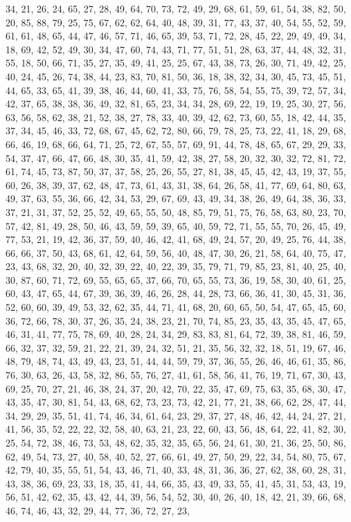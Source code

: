 \documentclass[
]{article}
\begin{document}
\begin{Schunk}
\begin{Soutput}
34, 21, 26, 24, 65, 27, 28, 49, 64, 70, 73, 72, 49, 29, 68, 61, 59, 61, 54, 38, 82, 50, 20, 85, 88, 79, 25, 75, 67, 62, 62, 64, 40, 48, 39, 31, 77, 43, 37, 40, 54, 55, 52, 59, 61, 61, 48, 65, 44, 47, 46, 57, 71, 46, 65, 39, 53, 71, 72, 28, 45, 22, 29, 49, 49, 34, 18, 69, 42, 52, 49, 30, 34, 47, 60, 74, 43, 71, 77, 51, 51, 28, 63, 37, 44, 48, 32, 31, 55, 18, 50, 66, 71, 35, 27, 35, 49, 41, 25, 25, 67, 43, 38, 73, 26, 30, 71, 49, 42, 25, 40, 24, 45, 26, 74, 38, 44, 23, 83, 70, 81, 50, 36, 18, 38, 32, 34, 30, 45, 73, 45, 51, 44, 65, 33, 65, 41, 39, 38, 46, 44, 60, 41, 33, 75, 76, 58, 54, 55, 75, 39, 72, 57, 34, 42, 37, 65, 38, 38, 36, 49, 32, 81, 65, 23, 34, 34, 28, 69, 22, 19, 19, 25, 30, 27, 56, 63, 56, 58, 62, 38, 21, 52, 38, 27, 78, 33, 40, 39, 42, 62, 73, 60, 55, 18, 42, 44, 35, 37, 34, 45, 46, 33, 72, 68, 67, 45, 62, 72, 80, 66, 79, 78, 25, 73, 22, 41, 18, 29, 68, 66, 46, 19, 68, 66, 64, 71, 25, 72, 67, 55, 57, 69, 91, 44, 78, 48, 65, 67, 29, 29, 33, 54, 37, 47, 66, 47, 66, 48, 30, 35, 41, 59, 42, 38, 27, 58, 20, 32, 30, 32, 72, 81, 72, 61, 74, 45, 73, 87, 50, 37, 37, 58, 25, 26, 55, 27, 81, 38, 45, 45, 42, 43, 19, 37, 55, 60, 26, 38, 39, 37, 62, 48, 47, 73, 61, 43, 31, 38, 64, 26, 58, 41, 77, 69, 64, 80, 63, 49, 37, 63, 55, 36, 66, 42, 34, 53, 29, 67, 69, 43, 49, 34, 38, 26, 49, 64, 38, 36, 33, 37, 21, 31, 37, 52, 25, 52, 49, 65, 55, 50, 48, 85, 79, 51, 75, 76, 58, 63, 80, 23, 70, 57, 42, 81, 49, 28, 50, 46, 43, 59, 59, 39, 65, 40, 59, 72, 71, 55, 55, 70, 26, 45, 49, 77, 53, 21, 19, 42, 36, 37, 59, 40, 46, 42, 41, 68, 49, 24, 57, 20, 49, 25, 76, 44, 38, 66, 66, 37, 50, 43, 68, 61, 42, 64, 59, 56, 40, 48, 47, 30, 26, 21, 58, 64, 40, 75, 47, 23, 43, 68, 32, 20, 40, 32, 39, 22, 40, 22, 39, 35, 79, 71, 79, 85, 23, 81, 40, 25, 40, 30, 87, 60, 71, 72, 69, 55, 65, 65, 37, 66, 70, 65, 55, 73, 36, 19, 58, 30, 40, 61, 25, 60, 43, 47, 65, 44, 67, 39, 36, 39, 46, 26, 28, 44, 28, 73, 66, 36, 41, 30, 45, 31, 36, 52, 60, 60, 39, 49, 53, 32, 62, 35, 44, 71, 41, 68, 20, 60, 65, 50, 54, 47, 65, 45, 60, 36, 72, 66, 78, 30, 37, 26, 35, 24, 38, 23, 21, 70, 74, 85, 23, 35, 43, 35, 45, 47, 65, 46, 31, 41, 77, 75, 78, 69, 40, 28, 24, 34, 29, 83, 83, 81, 64, 72, 39, 38, 81, 46, 59, 66, 32, 37, 32, 59, 21, 22, 21, 39, 24, 32, 51, 21, 35, 56, 32, 32, 18, 51, 19, 67, 46, 48, 79, 48, 74, 43, 49, 43, 23, 51, 44, 44, 59, 79, 37, 36, 55, 26, 46, 46, 61, 35, 86, 76, 30, 63, 26, 43, 58, 32, 86, 55, 76, 27, 41, 61, 58, 56, 41, 76, 19, 71, 67, 30, 43, 69, 25, 70, 27, 21, 46, 38, 24, 37, 20, 42, 70, 22, 35, 47, 69, 75, 63, 35, 68, 30, 47, 43, 35, 47, 30, 81, 54, 43, 68, 62, 73, 23, 73, 42, 21, 77, 21, 38, 66, 62, 28, 47, 44, 34, 29, 29, 35, 51, 41, 74, 46, 34, 61, 64, 23, 29, 37, 27, 48, 46, 42, 44, 24, 27, 21, 41, 56, 35, 52, 22, 22, 32, 58, 40, 63, 21, 23, 22, 60, 43, 56, 48, 64, 22, 41, 82, 30, 25, 54, 72, 38, 46, 73, 53, 48, 62, 35, 32, 35, 65, 56, 24, 61, 30, 21, 36, 25, 50, 86, 62, 49, 54, 73, 27, 40, 58, 40, 52, 27, 66, 61, 49, 27, 50, 29, 22, 34, 54, 80, 75, 67, 42, 79, 40, 35, 55, 51, 54, 43, 46, 71, 40, 33, 48, 31, 36, 36, 27, 62, 38, 60, 28, 31, 43, 38, 36, 69, 23, 33, 18, 35, 41, 44, 66, 35, 43, 49, 33, 55, 41, 45, 31, 53, 43, 19, 56, 51, 42, 62, 35, 43, 42, 44, 39, 56, 54, 52, 30, 40, 26, 40, 18, 42, 21, 39, 66, 68, 46, 74, 46, 43, 32, 29, 44, 77, 36, 72, 27, 23, 
\end{Soutput}
\end{Schunk}
\end{document}
